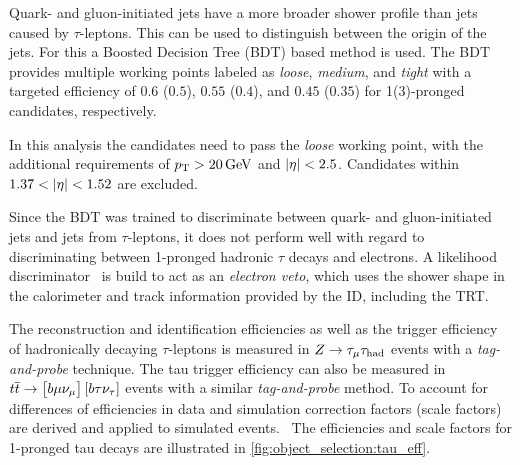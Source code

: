 Quark- and gluon-initiated jets have a more broader shower profile than jets caused by $\tau$-leptons.
This can be used to distinguish between the origin of the jets.
For this a Boosted Decision Tree (BDT) based method is used.
The BDT provides multiple working points labeled as \emph{loose}, \emph{medium}, and \emph{tight}
with a targeted efficiency of $0.6$ ($0.5$), $0.55$ ($0.4$), and $0.45$ ($0.35$) for 1(3)-pronged \tauhadvis{} candidates, respectively.

In this analysis the \tauhadvis{} candidates need to pass the \emph{loose} working point, with the additional requirements
of $\pt > \SI{20}{\GeV}$ and $\left|\eta\right| < 2.5$.
Candidates within $1.37 < \left|\eta\right| < 1.52$ are excluded.

Since the BDT was trained to discriminate between quark- and gluon-initiated jets and jets from $\tau$-leptons, it
does not perform well with regard to discriminating between 1-pronged hadronic $\tau$ decays and electrons.
A likelihood discriminator~\cite{Run1TauPaper} is build to act as an \emph{electron veto}, which uses the shower shape in the calorimeter
and track information provided by the ID, including the TRT\@.

The reconstruction and identification efficiencies as well as the trigger efficiency of hadronically decaying $\tau$-leptons is measured in
$Z \to \tau_\mu \tau_\text{had}$ events with a \emph{tag-and-probe} technique.
The tau trigger efficiency can also be measured in $t\overline{t} \to \left[b\mu\nu_\mu\right]\left[b\tau\nu_\tau\right]$ events
with a similar \emph{tag-and-probe} method.
To account for differences of efficiencies in data and simulation correction factors (scale factors) are derived and applied to simulated
events.~\cite{ATL-PHYS-PUB-2015-045,ATLAS-CONF-2017-029}
The efficiencies and scale factors for 1-pronged tau decays are illustrated in \cref{fig:object_selection:tau_eff}.

